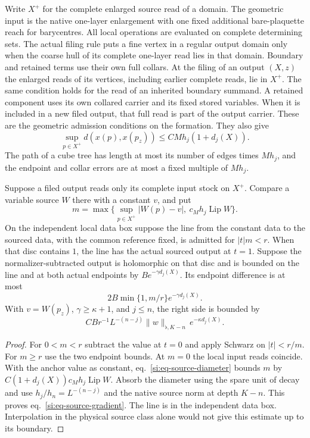 \documentclass[11pt,letterpaper,reqno]{amsart}
\makeatletter
\numberwithin{equation}{section}
\renewcommand{\eqref}[1]{\textup{eq.~\ref{#1}}}
\theoremstyle{definition}
\newcommand{\ms@minorstart}{%
  \pushQED{\qed}\renewcommand{\qedsymbol}{$\blacksquare$}}
\newenvironment{lemma}[1][]{\ms@minorstart\ms@lemma[#1]}
  {\popQED\endms@lemma}
\theoremstyle{remark}
\makeatother
\begin{document}
Write $X^+$ for the complete enlarged source read of a domain. The
geometric input is the native one-layer enlargement with one
fixed additional bare-plaquette reach for barycentres. All local
operations are evaluated on complete determining sets. The actual
filing rule puts a fine vertex in a regular output domain only
when the coarse hull of its complete one-layer read lies in that
domain. Boundary and retained terms use their own full collars.
At the
filing of an output $(X,z)$ the enlarged reads of its vertices,
including earlier complete reads, lie in $X^+$. The same condition
holds for the read of an inherited boundary summand. A retained
component uses its own collared carrier and its fixed stored
variables. When it is included in a new filed output, that full
read is part of the output carrier. These are the geometric
admission conditions on the formation. They also give
\begin{equation}\label{si:eq-source-diameter}
 \sup_{p\in X^+}d(x(p),x(p_z))\le C M h_j(1+d_j(X)).
\end{equation}
The path of a cube tree has length at most its number of edges
times $M h_j$, and the endpoint and collar errors are at most a
fixed multiple of $M h_j$.

\begin{samepage}
\begin{lemma}[Comparison on a local data line]\label{si:lem-source-data-line}
Suppose a filed output reads only its complete input stock on
$X^+$. Compare a variable source $W$ there with a constant $v$,
and put
\[
 m=\max\{\sup_{p\in X^+}|W(p)-v|,\ c_M h_j\operatorname{Lip}W\}.
\]
On the independent local data box suppose the line from the
constant data to the sourced data, with the common reference
fixed, is admitted for $|t|m<r$. When that disc contains $1$, the
line has the actual sourced output at $t=1$. Suppose the
normalizer-subtracted output is holomorphic on that disc and is
bounded on the line and at both actual endpoints by
$B e^{-\gamma d_j(X)}$. Its endpoint
difference is at most
\begin{equation}\label{si:eq-data-line-slope}
 2B\min\{1,m/r\} e^{-\gamma d_j(X)}.
\end{equation}
With $v=W(p_z)$, $\gamma\ge\kappa+1$, and $j\le n$, the right
side is bounded by
\begin{equation}\label{si:eq-source-gradient}
 C B r^{-1}L^{-(n-j)}\|w\|_{\flat,K-n}\,e^{-\kappa d_j(X)}.
\end{equation}
\end{lemma}
\end{samepage}
\begin{proof}
For $0<m<r$ subtract the value at $t=0$ and apply Schwarz on
$|t|<r/m$. For $m\ge r$ use the two endpoint bounds. At $m=0$ the
local input reads coincide. With the anchor value as constant,
\eqref{si:eq-source-diameter} bounds $m$ by
$C(1+d_j(X))c_M h_j\operatorname{Lip}W$. Absorb the diameter using
the spare unit of decay and use $h_j/h_n=L^{-(n-j)}$ and the native
source norm at depth $K-n$. This proves \eqref{si:eq-source-gradient}.
The line is in the independent data box. Interpolation in the
physical source class alone would not give this estimate up to its
boundary.
\end{proof}
\end{document}
